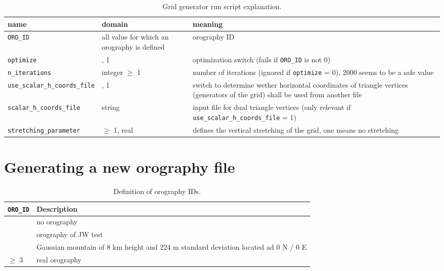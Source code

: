 \documentclass[10pt]{report}
\begin{document}
\renewcommand{\arraystretch}{1.2}
\begin{table}
\centering
\begin{tabular}{|>{\centering}p{5.0 cm}|>{\centering}p{3 cm}|>{\centering}p{7 cm}|}
\hline \textbf{name} & \textbf{domain} & \textbf{meaning} \tabularnewline
\hline\hline \texttt{\texttt{ORO\_ID}} & all value for which an orography is defined & orography ID \tabularnewline
\hline\hline \texttt{optimize} & 0, 1 & optimization switch (fails if \texttt{\texttt{ORO\_ID}} is not 0) \tabularnewline
\hline\hline \texttt{n\_iterations} & integer $\geq$ 1 & number of iterations (ignored if \texttt{optimize} = 0), 2000 seems to be a safe value \tabularnewline
\hline\hline \texttt{use\_scalar\_h\_coords\_file} & 0, 1 & switch to determine wether horizontal coordinates of triangle vertices (generators of the grid) shall be used from another file \tabularnewline
\hline\hline \texttt{scalar\_h\_coords\_file} & string & input file for dual triangle vertices (only relevant if \texttt{use\_scalar\_h\_coords\_file} = 1) \tabularnewline
\hline\hline \texttt{stretching\_parameter} & $\geq$ 1, real & defines the vertical stretching of the grid, one means no stretching \tabularnewline
\hline
\end{tabular}
\caption{Grid generator run script explanation.}
\label{tab:grid_generator_run_file_explanation}
\end{table}
\renewcommand{\arraystretch}{1}

\chapter{Generating a new orography file}
\label{chap:generating_a_new_orography_file}

\renewcommand{\arraystretch}{1.2}
\begin{table}
\centering
\begin{tabular}{|>{\centering}p{4.0 cm}|>{\centering}p{8 cm}|}
\hline \textbf{\texttt{ORO\_ID}} & \textbf{Description} \tabularnewline
\hline\hline 0 & no orography \tabularnewline
\hline 1 & orography of JW test \tabularnewline
\hline 2 & Gaussian mountain of 8 km height and 224 m standard deviation located ad 0 N / 0 E\tabularnewline
\hline $\geq$ 3 & real orography \tabularnewline
\hline
\end{tabular}
\caption{Definition of orography IDs.}
\label{tab:oro_id_definition}
\end{table}
\renewcommand{\arraystretch}{1}
\end{document}
